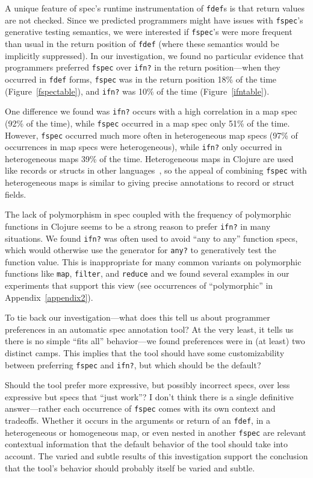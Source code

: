 A unique feature of spec's runtime instrumentation of \texttt{fdef}s is that
return values are not checked. Since we predicted programmers might have
issues with \texttt{fspec}'s generative testing semantics, we were interested
if \texttt{fspec}'s were more frequent than usual in the return position
of \texttt{fdef} (where these semantics would be implicitly suppressed).
In our investigation, we found no particular evidence that programmers preferred
\texttt{fspec} over \texttt{ifn?} in the return position---when they occurred in \texttt{fdef} forms,
\texttt{fspec} was in the return position 18\% of the time (Figure~\ref{fspectable}),
and \texttt{ifn?} was 10\% of the time (Figure~\ref{ifntable}).

One difference we found was \texttt{ifn?} occurs with a high correlation in
a map spec (92\% of the time), while \texttt{fspec} occurred in a map spec
only 51\% of the time.
However, \texttt{fspec} occurred much more often in heterogeneous map specs
(97\% of occurrences in map specs were heterogeneous), while \texttt{ifn?}
only occurred in heterogeneous maps 39\% of the time.
Heterogeneous maps in Clojure are used like records or structs in other
languages~\cite{bonnaire2016practical}, so the appeal of combining
\texttt{fspec} with heterogeneous maps is similar to giving precise annotations
to record or struct fields.

The lack of polymorphism in spec coupled with the frequency of polymorphic functions
in Clojure seems to be a strong reason to prefer \texttt{ifn?} in many situations.
We found \texttt{ifn?} was often used to avoid ``any to any'' function
specs, which would otherwise use the generator for \texttt{any?} to generatively test
the function value. This is inappropriate for many common variants on polymorphic functions like
\texttt{map}, \texttt{filter}, and \texttt{reduce}
and we found several examples in our experiments that support this view
(see occurrences of ``polymorphic'' in Appendix~\ref{appendix2}).


To tie back our investigation---what does this tell us about programmer preferences in an automatic spec annotation
tool? At the very least, it tells us there is no simple ``fits all'' behavior---we found
preferences were in (at least) two distinct camps.
This implies that the tool should have some customizability between preferring
\texttt{fspec} and \texttt{ifn?}, but which should be the default?

Should the tool prefer more expressive, but possibly incorrect specs, over less
expressive but specs that ``just work''?
I don't think there is a single definitive answer---rather each occurrence of \texttt{fspec}
comes with its own context and tradeoffs. Whether it occurs in the arguments or return of
an \texttt{fdef}, in a heterogeneous or homogeneous map, or even nested in another \texttt{fspec}
are relevant contextual information that the default behavior of the tool should take
into account. The varied and subtle results of this investigation support the conclusion
that the tool's behavior should probably itself be varied and subtle.

